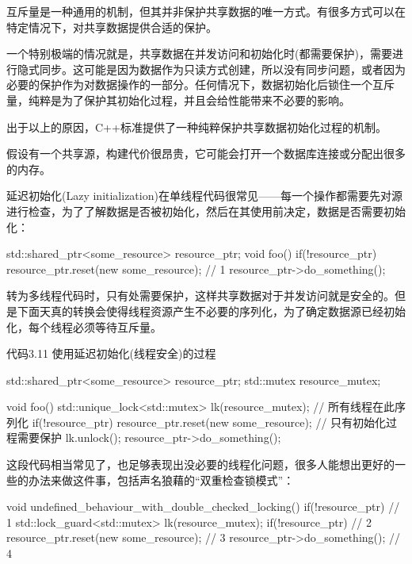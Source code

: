 
互斥量是一种通用的机制，但其并非保护共享数据的唯一方式。有很多方式可以在特定情况下，对共享数据提供合适的保护。

一个特别极端的情况就是，共享数据在并发访问和初始化时(都需要保护)，需要进行隐式同步。这可能是因为数据作为只读方式创建，所以没有同步问题，或者因为必要的保护作为对数据操作的一部分。任何情况下，数据初始化后锁住一个互斥量，纯粹是为了保护其初始化过程，并且会给性能带来不必要的影响。

出于以上的原因，C++标准提供了一种纯粹保护共享数据初始化过程的机制。


假设有一个共享源，构建代价很昂贵，它可能会打开一个数据库连接或分配出很多的内存。

延迟初始化(Lazy initialization)在单线程代码很常见——每一个操作都需要先对源进行检查，为了了解数据是否被初始化，然后在其使用前决定，数据是否需要初始化：

\begin{cpp}
std::shared_ptr<some_resource> resource_ptr;
void foo()
{
  if(!resource_ptr)
  {
    resource_ptr.reset(new some_resource);  // 1
  }
  resource_ptr->do_something();
}
\end{cpp}

转为多线程代码时，只有处需要保护，这样共享数据对于并发访问就是安全的。但是下面天真的转换会使得线程资源产生不必要的序列化，为了确定数据源已经初始化，每个线程必须等待互斥量。

代码3.11 使用延迟初始化(线程安全)的过程

\begin{cpp}
std::shared_ptr<some_resource> resource_ptr;
std::mutex resource_mutex;

void foo()
{
  std::unique_lock<std::mutex> lk(resource_mutex);  // 所有线程在此序列化
  if(!resource_ptr)
  {
    resource_ptr.reset(new some_resource);  // 只有初始化过程需要保护
  }
  lk.unlock();
  resource_ptr->do_something();
}
\end{cpp}

这段代码相当常见了，也足够表现出没必要的线程化问题，很多人能想出更好的一些的办法来做这件事，包括声名狼藉的“双重检查锁模式”：

\begin{cpp}
void undefined_behaviour_with_double_checked_locking()
{
  if(!resource_ptr)  // 1
  {
    std::lock_guard<std::mutex> lk(resource_mutex);
    if(!resource_ptr)  // 2
    {
      resource_ptr.reset(new some_resource);  // 3
    }
  }
  resource_ptr->do_something();  // 4
}
\end{cpp}

